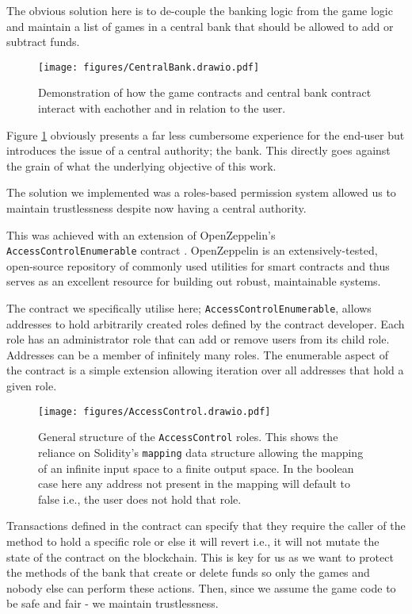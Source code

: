 \documentclass[10pt,journal,compsoc]{IEEEtran}
\begin{document}
The obvious solution here is to de-couple the banking logic from the game logic and maintain a list of games in a central bank that should be allowed to add or subtract funds.

\begin{figure}[!h]
    \centering
    \texttt{[image: figures/CentralBank.drawio.pdf]}
    \caption{Demonstration of how the game contracts and central bank contract interact with eachother and in relation to the user.}
    \label{fig:centralbank}
\end{figure}

Figure \ref{fig:centralbank} obviously presents a far less cumbersome experience for the end-user but introduces the issue of a central authority; the bank. This directly goes against the grain of what the underlying objective of this work.

The solution we implemented was a roles-based permission system allowed us to maintain trustlessness despite now having a central authority. 

This was achieved with an extension of OpenZeppelin's \texttt{AccessControlEnumerable} contract \cite{access_openzeppelin_docs}. OpenZeppelin is an extensively-tested, open-source repository of commonly used utilities for smart contracts and thus serves as an excellent resource for building out robust, maintainable systems.

The contract we specifically utilise here; \texttt{AccessControlEnumerable}, allows addresses to hold arbitrarily created roles defined by the contract developer. Each role has an administrator role that can add or remove users from its child role. Addresses can be a member of infinitely many roles. The enumerable aspect of the contract is a simple extension allowing iteration over all addresses that hold a given role.


\begin{figure}[!h]
    \centering
    \texttt{[image: figures/AccessControl.drawio.pdf]}
    \caption{General structure of the \texttt{AccessControl} roles. This shows the reliance on Solidity's \texttt{mapping} data structure allowing the mapping of an infinite input space to a finite output space. In the boolean case here any address not present in the mapping will default to false i.e., the user does not hold that role.}
    \label{fig:accesscontrol}
\end{figure}

Transactions defined in the contract can specify that they require the caller of the method to hold a specific role or else it will revert i.e., it will not mutate the state of the contract on the blockchain. This is key for us as we want to protect the methods of the bank that create or delete funds so only the games and nobody else can perform these actions. Then, since we assume the game code to be safe and fair - we maintain trustlessness.
\end{document}
